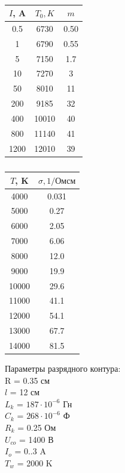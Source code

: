 \newpage

\begin{table}[ph!]\label{table_1}
	\caption{}
	\centering
	\begin{tabular}{|c|c|c|}
		\hline
		$I$, A & $T_0, K$& $m$\\
		\hline
		0.5 & 6730 & 0.50\\
		\hline
		1 & 6790 & 0.55 \\
		\hline
		5 & 7150 & 1.7 \\
		\hline
		10 & 7270 & 3 \\
		\hline
		50 & 8010 & 11 \\
		\hline
		200 & 9185 & 32 \\
		\hline
		400 & 10010 & 40 \\
		\hline
		800 & 11140 & 41 \\
		\hline
		1200 & 12010 & 39 \\
		\hline
	\end{tabular}
\end{table}

\begin{table}[ph!]\label{table_2}
	\caption{}
	\centering
	\begin{tabular}{|c|c|}
		\hline
		$T$, K & $\sigma, 1/Ом см$\\
		\hline
		4000 & 0.031 \\
		\hline
		5000 & 0.27 \\
		\hline
		6000 & 2.05 \\
		\hline
		7000 & 6.06 \\
		\hline
		8000 & 12.0 \\
		\hline
		9000 & 19.9 \\
		\hline
		10000 & 29.6 \\
		\hline
		11000 & 41.1 \\
		\hline
		12000 & 54.1 \\
		\hline
		13000 & 67.7 \\
		\hline
		14000 & 81.5 \\
		\hline
	\end{tabular}
\end{table}

Параметры разрядного контура: \\
R = 0.35 см \\
$l$ = 12 см \\
$L_k$ = $187 \cdot 10^{-6}$ Гн \\
$C_k$ = $268 \cdot 10^{-6}$ Ф \\
$R_k$ = 0.25 Ом \\
$U_{co}$ = 1400 В \\
$I_o$ = 0..3 A \\
$T_w$ = 2000 K\\

